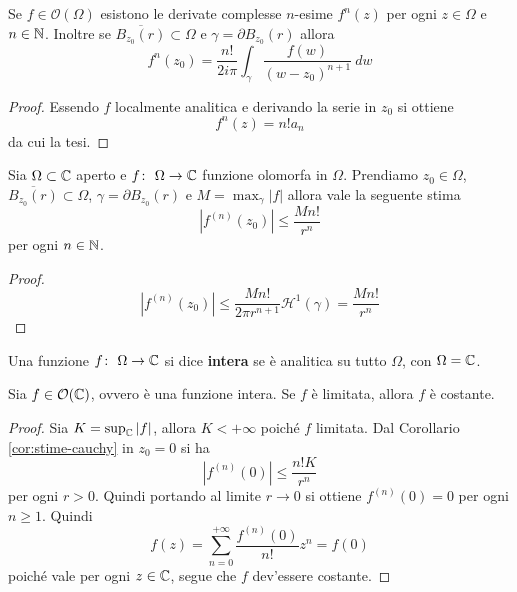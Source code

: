 \begin{corollary}
  Se $f \in \mathcal{O}(\Omega)$ esistono le derivate complesse $n$-esime
  $f^{n}(z)$ per ogni $z \in \Omega$ e $n \in \mathbb{N}$. Inoltre se
  $\overline{B_{z_0}(r)} \subset \Omega$ e $\gamma = \partial B_{z_0}(r)$
  allora
  \begin{equation*}
    f^n(z_0) = \frac{n!}{2i\pi} \int_\gamma \frac{f(w)}{(w-z_0)^{n+1}}\ dw
  \end{equation*}
\end{corollary}
\begin{proof}
  Essendo $f$ localmente analitica e derivando la serie in $z_0$ si ottiene 
  \begin{equation*}
    f^n(z) = n!a_n 
  \end{equation*}
  da cui la tesi.
\end{proof}

\begin{corollary}
  Sia $\Omega \subset \mathbb{C}$ aperto e $f \colon\ \Omega \rightarrow \mathbb{C}$ funzione
  olomorfa in $\Omega$. Prendiamo $z_0 \in \Omega$, $\overline{B_{z_0}(r)}
  \subset \Omega$, $\gamma = \partial B_{z_0}(r)$ e $M = \max_{\gamma} |f|$
  allora vale la seguente stima
  \begin{equation*}
    |f^{(n)}(z_0)| \le \frac{Mn!}{r^n}
  \end{equation*}
  per ogni $n \in \mathbb{N}$.
  \label{cor:stime-cauchy}
\end{corollary}
\begin{proof}
  \begin{equation*}
    |f^{(n)}(z_0)| \le \frac{Mn!}{2\pi r^{n+1}} \mathcal{H}^1(\gamma)
    =\frac{Mn!}{r^n}
  \end{equation*}
\end{proof}

\begin{definition}
  Una funzione $f \colon\ \Omega \rightarrow \mathbb{C}$ si dice \textbf{intera} se è analitica su
  tutto $\Omega$, con $\Omega = \mathbb{C}$. 
\end{definition}

\begin{theorem}[Liouville]
  Sia $f \in \mathcal{O}(\mathbb{C})$, ovvero è una funzione intera. Se $f$ è limitata, allora
  $f$ è costante.
  \label{thr:liouville}
\end{theorem}
\begin{proof}
  Sia $K = \sup_{\mathbb{C}} |f|$, allora $K < +\infty$ poiché $f$ limitata. Dal 
  Corollario \ref{cor:stime-cauchy} in $z_0 = 0$ si ha 
  \begin{equation*}
    |f^{(n)}(0)| \le \frac{n! K}{r^n}
  \end{equation*}
  per ogni $r > 0$. Quindi portando al limite $r \to 0$ si ottiene
  $f^{\left(n \right)}(0) = 0$ per ogni $n \ge 1$. Quindi
  \begin{equation*}
    f(z) = \sum^{+\infty}_{n=0} \frac{f^{(n)}(0)}{n!} z^n = f(0)
  \end{equation*}
  poiché vale per ogni $z\in \mathbb{C}$, segue che $f$ dev'essere costante.
\end{proof}

